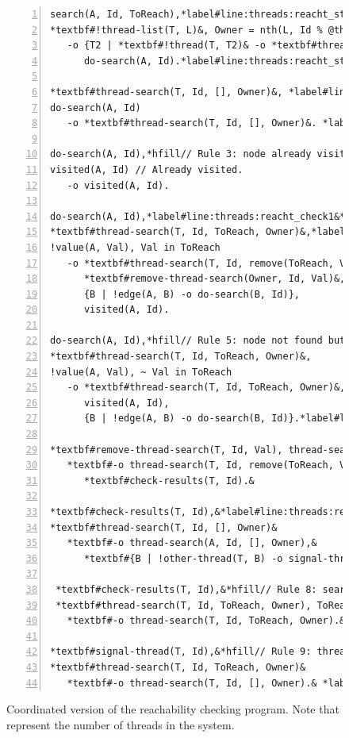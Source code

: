 \begin{figure}[h]
\begin{Verbatim}[numbers=left,fontsize=\codesize,commandchars=*\#\&]
search(A, Id, ToReach),*label#line:threads:reacht_start1&*hfill// Rule 1: initialize search.
*textbf#!thread-list(T, L)&, Owner = nth(L, Id % @threads) // Allocate search to a thread.
   -o {T2 | *textbf#!thread(T, T2)& -o *textbf#thread-search(T2, Id, ToReach, Owner)&},*label#line:threads:reacht_threads&
      do-search(A, Id).*label#line:threads:reacht_start2&

*textbf#thread-search(T, Id, [], Owner)&, *label#line:threads:reacht_prune1&*hfill// Rule 2: search completed.
do-search(A, Id)
   -o *textbf#thread-search(T, Id, [], Owner)&. *label#line:threads:reacht_prune2&

do-search(A, Id),*hfill// Rule 3: node already visited.
visited(A, Id) // Already visited.
   -o visited(A, Id).

do-search(A, Id),*label#line:threads:reacht_check1&*label#line:bfs_join1&*hfill// Rule 4: node found.
*textbf#thread-search(T, Id, ToReach, Owner)&,*label#line:threads:reacht_join2&
!value(A, Val), Val in ToReach
   -o *textbf#thread-search(T, Id, remove(ToReach, Val), Owner)&,
      *textbf#remove-thread-search(Owner, Id, Val)&, // Tell owner thread about it.*label#line:threads:reacht_remove&
      {B | !edge(A, B) -o do-search(B, Id)},
      visited(A, Id).

do-search(A, Id),*hfill// Rule 5: node not found but propagate search.
*textbf#thread-search(T, Id, ToReach, Owner)&,
!value(A, Val), ~ Val in ToReach
   -o *textbf#thread-search(T, Id, ToReach, Owner)&,
      visited(A, Id),
      {B | !edge(A, B) -o do-search(B, Id)}.*label#line:threads:reacht_check2&

*textbf#remove-thread-search(T, Id, Val), thread-search(T, Id, ToReach, Owner)&*hfill// Rule 6: node found.
   *textbf#-o thread-search(T, Id, remove(ToReach, Val), Owner),&
      *textbf#check-results(T, Id).&

*textbf#check-results(T, Id),&*label#line:threads:reacht_reached1&*hfill// Rule 7: search is completed.
*textbf#thread-search(T, Id, [], Owner)&
   *textbf#-o thread-search(A, Id, [], Owner),&
      *textbf#{B | !other-thread(T, B) -o signal-thread(B, Id)}.&*label#line:threads:reacht_reached2&

 *textbf#check-results(T, Id),&*hfill// Rule 8: search not completed yet.
 *textbf#thread-search(T, Id, ToReach, Owner), ToReach <> []&
   *textbf#-o thread-search(T, Id, ToReach, Owner).&

*textbf#signal-thread(T, Id),&*hfill// Rule 9: thread knows search is done.*label#line:threads:reacht_knows1&
*textbf#thread-search(T, Id, ToReach, Owner)&
   *textbf#-o thread-search(T, Id, [], Owner).& *label#line:threads:reacht_knows2&
\end{Verbatim}
\caption{Coordinated version of the reachability checking program. Note
that  represent the number of threads in the system.}
\label{code:threads:reach_threads}
\end{figure}

